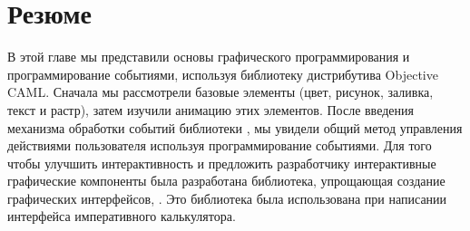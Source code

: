 \section{Резюме}
\label{sec:summary_5}

 В этой главе мы представили основы графического программирования и 
программирование событиями, используя библиотеку  дистрибутива 
Objective CAML. Сначала мы рассмотрели базовые элементы (цвет, рисунок, заливка, 
текст и растр), затем изучили анимацию этих элементов. После введения 
механизма обработки событий библиотеки , мы увидели общий метод 
управления действиями пользователя используя программирование событиями. Для 
того чтобы улучшить интерактивность и предложить разработчику интерактивные 
графические компоненты была разработана библиотека, упрощающая создание 
графических интерфейсов, . Это библиотека была использована при 
написании интерфейса императивного калькулятора.
